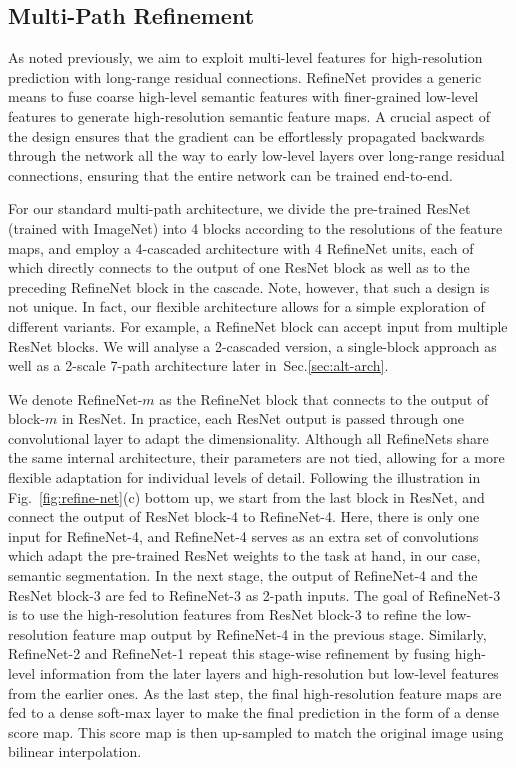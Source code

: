 \documentclass[10pt,twocolumn,letterpaper]{article}
\newcommand{\Fig}{Fig.\xspace}
\newcommand{\Sec}{Sec.\xspace}
\newcommand{\refOurFig}{\ref{fig:refine-net}(c)\xspace}
\begin{document}
\subsection{Multi-Path Refinement}\label{sec:method-overview}

As noted previously, we aim to exploit multi-level features for high-resolution prediction with long-range residual connections. 
RefineNet provides a generic means to fuse coarse high-level semantic features with finer-grained low-level features to generate high-resolution semantic feature maps. A crucial aspect of the design ensures that the gradient can be effortlessly propagated backwards through the network all the way to early low-level layers over long-range residual connections, ensuring that the entire network can be trained end-to-end. 


For our standard multi-path architecture, we divide the pre-trained ResNet (trained with ImageNet) into 4 blocks according to the resolutions of the feature maps, and employ a 4-cascaded architecture with 4 RefineNet units, each of which directly connects to the output of one ResNet block as well as to the preceding RefineNet block in the cascade. 
Note, however, that such a design is not unique. In fact, our flexible architecture allows for a simple exploration of different variants. For example, a RefineNet block can accept input from multiple ResNet blocks. We will analyse a 2-cascaded version, a single-block approach as well as a 2-scale 7-path architecture later in~\Sec\ref{sec:alt-arch}.

We denote RefineNet-$m$ as the RefineNet block that connects to the output of block-$m$ in ResNet.
In practice, each ResNet output is passed through one convolutional layer to adapt the dimensionality.
Although all RefineNets share the same internal architecture, their parameters are not tied, allowing for a more flexible adaptation for individual levels of detail.
Following the illustration in \Fig~\refOurFig bottom up, we start from the last block in ResNet, and connect the output of ResNet block-4 to RefineNet-4. Here, there is only one input for RefineNet-4, and RefineNet-4 serves as an extra set of convolutions which adapt the pre-trained ResNet weights to the task at hand, in our case, semantic segmentation.
In the next stage, the output of RefineNet-4 and the ResNet block-3 are fed to RefineNet-3 as 2-path inputs.
The goal of RefineNet-3 is to use the high-resolution features from ResNet block-3 to refine the low-resolution feature map output by RefineNet-4 in the previous stage.
Similarly, RefineNet-2 and RefineNet-1 repeat this stage-wise refinement by fusing high-level information from the later layers and high-resolution but low-level features from the earlier ones. As the last step, the final high-resolution feature maps are fed to a dense soft-max layer to make the final prediction in the form of a dense score map. This score map is then up-sampled to match the original image using bilinear interpolation.
\end{document}
